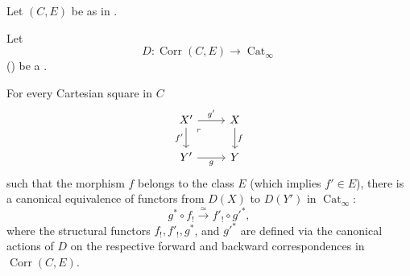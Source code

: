 \begin{proposition} \label{proposition:base_change_theorem_for_a_three_functor_formalism_for_an_infty_category_with_finite_limits_and_a_class_of_morphisms_containing_isomorphisms_and_stable_under_pullback_and_composition}
    Let $(C,E)$ be as in . 

    Let 
    $$D \colon \operatorname{Corr}(C,E) \to \operatorname{Cat}_\infty$$
    ()
    be a .

    For every Cartesian square in $C$
    \begin{equation}\label{eq:base_change_cartesian_square}
    \begin{tikzcd}
        {X'} & X \\
        {Y'} & Y
        \arrow["{g'}", from=1-1, to=1-2]
        \arrow["{f'}"', from=1-1, to=2-1]
        \arrow["f", from=1-2, to=2-2]
        \arrow["g"', from=2-1, to=2-2]
        \arrow["\lrcorner"{anchor=center, pos=0.125, rotate=180}, draw=none, from=1-1, to=2-2]
    \end{tikzcd}
    \end{equation}
    such that the morphism $f$ belongs to the class $E$ (which implies $f' \in E$), there is a canonical equivalence of functors from $D(X)$ to $D(Y')$ in $\operatorname{Cat}_\infty$:
    $$g^* \circ f_! \xrightarrow{\,\simeq\,} f'_! \circ g'^*,$$
    where the structural functors $f_!, f'_!, g^*$, and $g'^*$ are defined via the canonical actions of $D$ on the respective forward and backward correspondences in $\operatorname{Corr}(C,E)$.
\end{proposition}

